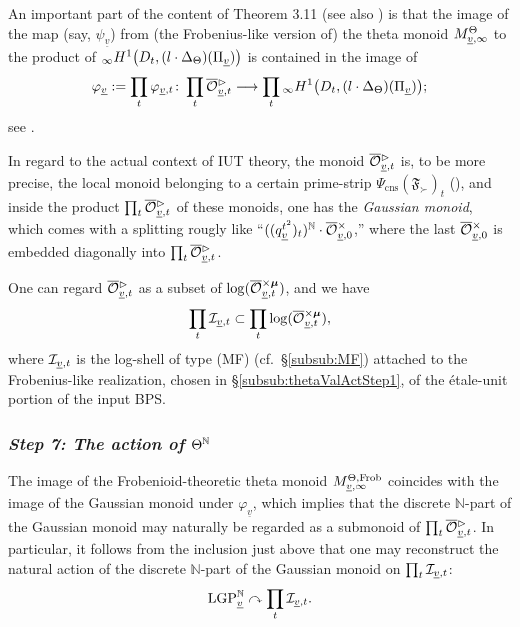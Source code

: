 \documentclass[12pt, reqno, a4paper]{amsart}
\def\udl#1{\underline{#1}} %
\def\longto{\longrightarrow}
\def\acton{\curvearrowright} %
\def\bN{\mathbb{N}} %
\def\fF{{\mathfrak{F}}}
\def\uv{\udl{v}} %
\begin{document}
An important part of the content of Theorem 3.11 (see also \cite[Prop.\ 3.5(ii), pp.\ 517--520]{MR4225475}) is that the image of the map (say, $\psi_{\uv}$) from (the Frobenius-like version of) the theta monoid \(M^{\Th}_{\uv,\infty}\) to the product of ${}_{\infty}H^1\bigl(D_t,(l\cdot\Delta_{\Th})(\Pi_{\uv})\bigr)$ is contained in the image of 
\[
  \varphi_{\uv}:=\prod_t\varphi_{\uv,t}\colon\prod_t \oOOt_{\uv,t}\longto\prod_t{}_{\infty}H^1\bigl(D_t,(l\cdot\Delta_{\Th})(\Pi_{\uv})\bigr); 
\]
see \cite[Thm.~3.11(ii), pp.~574--575; Rem.~3.11.1(iii)--(v), pp.~581--584]{MR4225475}.


\begin{rem}
In regard to the actual context of IUT theory, the monoid $\oOOt_{\uv,t}$ is, to be more precise, the local monoid belonging to a certain prime-strip $\Psi_{\text{cns}}(\fF_{\succ})_t$ (\cite[Cor.\ 4.10(i), pp.\ 384--385]{MR4225474}), and inside the product $\prod_t \oOOt_{\uv,t}$ of these monoids, one has the {\it Gaussian monoid}, which comes with a splitting rougly like ``$((q^{t^2}_{\uv})_t)^{\bN}\cdot \oOOx_{\uv,0}$,'' where the last $\oOOx_{\uv,0}$ is embedded diagonally into $\prod_t \oOOt_{\uv,t}$.
\end{rem}

One can regard $\oOOt_{\uv,t}$ as a subset of $\log(\oOOxmu_{\uv,t})$, and we have
\[
    \prod_t\LS_{\uv,t}
    \subset
    \prod_t\log(\oOOxmu_{\uv,t}),
\]
where \(\LS_{\uv,t}\) is the log-shell of type (MF) (cf.\ \S\ref{subsub:MF}) attached to the Frobenius-like realization, chosen in \S\ref{subsub:thetaValActStep1}, of the \'etale-unit portion of the input BPS.


\subsubsection{\emph{Step 7: The action of \(\Th^{\bN}\)}}\label{subsub:actionOfTheta}
The image of the Frobenioid-theoretic theta monoid $M^{\Th,\text{Frob}}_ {\uv,\infty}$ coincides with the image of the Gaussian monoid under $\varphi_{\uv}$, which implies that 
the discrete $\bN$-part of the Gaussian monoid may naturally be regarded as a submonoid of 
$\prod_t \oOOt_{\uv,t}$.  In particular, it follows from the inclusion just above that one may reconstruct the natural action of the discrete $\bN$-part of the Gaussian monoid on $\prod_t\LS_{\uv,t}$:  
\begin{equation}\label{eqn:thetaNActionLogShell}
  \LGP^{\bN}_{\uv}
  \acton
  \prod_t \LS_{\uv,t}.
\end{equation}
\end{document}
